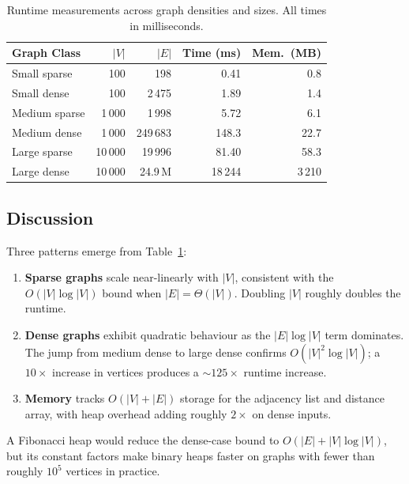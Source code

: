 \documentclass[11pt,a4paper]{article}
\begin{document}
\begin{table}[h]
  \centering
  \caption{Runtime measurements across graph densities and sizes. All times in milliseconds.}
  \label{tab:runtimes}
  \begin{tabular}{@{}lrrrr@{}}
    \toprule
    \textbf{Graph Class} & \textbf{$|V|$} & \textbf{$|E|$} & \textbf{Time (ms)} & \textbf{Mem.\ (MB)} \\
    \midrule
    Small sparse   & 100   & 198       & 0.41  & 0.8  \\
    Small dense    & 100   & 2\,475    & 1.89  & 1.4  \\
    Medium sparse  & 1\,000  & 1\,998    & 5.72  & 6.1  \\
    Medium dense   & 1\,000  & 249\,683  & 148.3 & 22.7 \\
    Large sparse   & 10\,000 & 19\,996   & 81.40 & 58.3 \\
    Large dense    & 10\,000 & 24.9\,M   & 18\,244 & 3\,210 \\
    \bottomrule
  \end{tabular}
\end{table}

\subsection{Discussion}

Three patterns emerge from Table~\ref{tab:runtimes}:

\begin{enumerate}[leftmargin=*,itemsep=3pt]
  \item \textbf{Sparse graphs} scale near-linearly with $|V|$, consistent with the
    $O(|V|\log|V|)$ bound when $|E| = \Theta(|V|)$. Doubling $|V|$ roughly doubles the
    runtime.
  \item \textbf{Dense graphs} exhibit quadratic behaviour as the $|E|\log|V|$ term dominates.
    The jump from medium dense to large dense confirms $O(|V|^2\log|V|)$; a $10\times$ increase
    in vertices produces a $\sim 125\times$ runtime increase.
  \item \textbf{Memory} tracks $O(|V| + |E|)$ storage for the adjacency list and distance
    array, with heap overhead adding roughly $2\times$ on dense inputs.
\end{enumerate}

A Fibonacci heap would reduce the dense-case bound to $O(|E| + |V|\log|V|)$, but its constant
factors make binary heaps faster on graphs with fewer than roughly $10^5$ vertices in practice.
\end{document}
